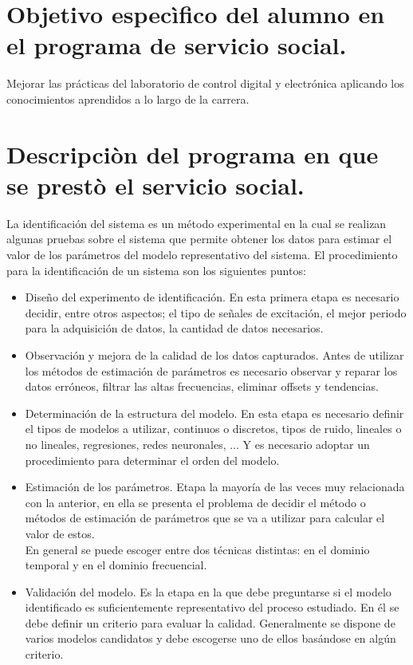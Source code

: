 \documentclass[a4paper,12pt]{article}
\begin{document}
    \section{Objetivo especìfico del alumno en el programa de servicio social.}
        Mejorar las prácticas del laboratorio de control digital y electrónica aplicando los conocimientos aprendidos a lo largo de la carrera.

    \section{Descripciòn del programa en que se prestò el servicio social.}
    La identificación del sistema es un método experimental en la cual se realizan algunas pruebas sobre el sistema que permite obtener los datos para estimar el valor de los parámetros del modelo representativo del sistema.
    El procedimiento para la identificación de un sistema son los siguientes puntos:
    \begin{itemize}
        \item Diseño del experimento de identificación.
        En esta primera etapa es necesario decidir, entre otros aspectos; el tipo de señales de excitación, el mejor periodo para la adquisición de datos, la cantidad de datos necesarios.
        
        \item Observación y mejora de la calidad de los datos capturados. 
        Antes de utilizar los métodos de estimación de parámetros es necesario observar y reparar los datos erróneos, filtrar las altas frecuencias, eliminar offsets y tendencias.

        \item Determinación de la estructura del modelo. En esta etapa es necesario definir el tipos de modelos a   utilizar, continuos   o   discretos, tipos   de   ruido,   lineales   o   no   lineales,   regresiones,   redes neuronales, ... Y es necesario adoptar un procedimiento para determinar el orden del modelo.

        \item Estimación de los parámetros. 
        Etapa la mayoría de las veces muy relacionada con la anterior, en ella se presenta el problema de decidir el método o métodos de estimación de parámetros que se va a utilizar para calcular el valor de estos.\\ 
        En general se puede escoger entre dos técnicas distintas: en el dominio temporal y en el dominio frecuencial.
        
        \item Validación del modelo.  Es la etapa en la que debe preguntarse si el modelo identificado es suficientemente representativo del proceso estudiado. En él se debe definir un criterio para evaluar la calidad. Generalmente se dispone de varios modelos candidatos y debe escogerse uno de ellos basándose en algún criterio.
    \end{itemize}
\end{document}
